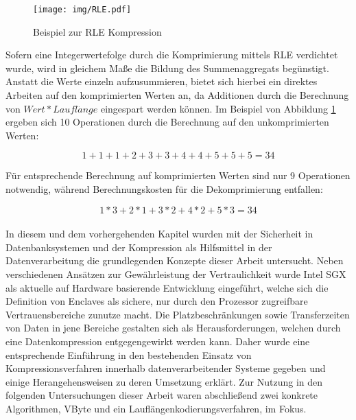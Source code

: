 \begin{figure}
	\texttt{[image: img/RLE.pdf]}
	\centering
	\caption{Beispiel zur RLE Kompression}
	\label{fig:rle}
\end{figure}

Sofern eine Integerwertefolge durch die Komprimierung mittels \ac{RLE} verdichtet wurde, wird in gleichem Maße die Bildung des Summenaggregats begünstigt. Anstatt die Werte einzeln aufzusummieren, bietet sich hierbei ein direktes Arbeiten auf den komprimierten Werten an, da Additionen durch die Berechnung von $Wert * Laufl\ddot{a}nge$ eingespart werden können. Im Beispiel von Abbildung \ref{fig:rle} ergeben sich 10 Operationen durch die Berechnung auf den unkomprimierten Werten:

\begin{equation*}
	1 + 1 + 1 + 2 + 3 + 3 + 4 + 4 + 5 + 5 + 5 = 34
\end{equation*}

Für entsprechende Berechnung auf komprimierten Werten sind nur 9 Operationen notwendig, während Berechnungskosten für die Dekomprimierung entfallen:

\begin{equation*}
	1 * 3 + 2 * 1 + 3 * 2 + 4 * 2 + 5 * 3 = 34
\end{equation*}

\paragraph{}
In diesem und dem vorhergehenden Kapitel wurden mit der Sicherheit in Datenbanksystemen und der Kompression als Hilfsmittel in der Datenverarbeitung die grundlegenden Konzepte dieser Arbeit untersucht. Neben verschiedenen Ansätzen zur Gewährleistung der Vertraulichkeit wurde Intel \ac{SGX} als aktuelle auf Hardware basierende Entwicklung eingeführt, welche sich die Definition von Enclaves als sichere, nur durch den Prozessor zugreifbare Vertrauensbereiche zunutze macht. Die Platzbeschränkungen sowie Transferzeiten von Daten in jene Bereiche gestalten sich als Herausforderungen, welchen durch eine Datenkompression entgegengewirkt werden kann. Daher wurde eine entsprechende Einführung in den bestehenden Einsatz von Kompressionsverfahren innerhalb datenverarbeitender Systeme gegeben und einige Herangehensweisen zu deren Umsetzung erklärt. Zur Nutzung in den folgenden Untersuchungen dieser Arbeit waren abschließend zwei konkrete Algorithmen, VByte und ein Lauflängenkodierungsverfahren, im Fokus.
